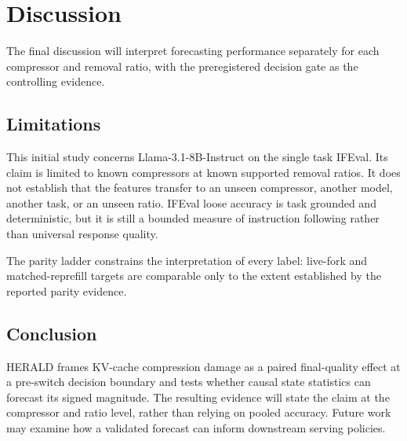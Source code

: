 \section{Discussion}

The final discussion will interpret forecasting performance separately for
each compressor and removal ratio, with the preregistered decision gate as the
controlling evidence. 

\subsection{Limitations}

This initial study concerns Llama-3.1-8B-Instruct \citep{llama31} on the
single task IFEval. Its claim is limited to known compressors at known
supported removal ratios. It does not establish that the features transfer to
an unseen compressor, another model, another task, or an unseen ratio. IFEval
loose accuracy is task grounded and deterministic, but it is still a bounded
measure of instruction following rather than universal response quality.

The parity ladder constrains the interpretation of every label: live-fork and
matched-reprefill targets are comparable only to the extent established by the
reported parity evidence. 

\subsection{Conclusion}

HERALD frames KV-cache compression damage as a paired final-quality effect at
a pre-switch decision boundary and tests whether causal state statistics can
forecast its signed magnitude. The resulting evidence will state the claim at
the compressor and ratio level, rather than relying on pooled accuracy.
Future work may examine how a validated forecast can inform downstream
serving policies.
